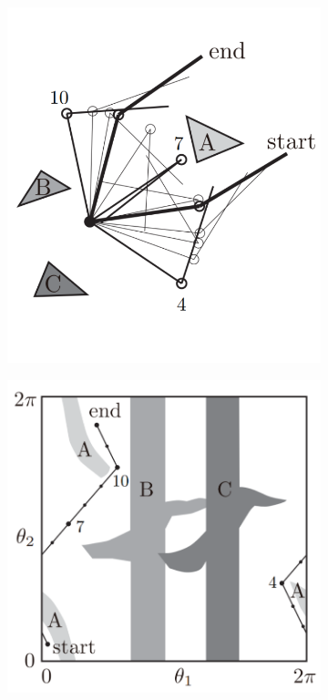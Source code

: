 \documentclass[twoside]{article}
\begin{document}
\begin{figure}[H]
\begin{subfigure}[t]{0.20\textwidth}
\caption{}
\end{subfigure}
\hfil
\begin{subfigure}[t]{0.39\textwidth}
\centering
\includegraphics[width=\columnwidth]{ConfigSpaceDiff2.png}
\caption{}
\end{subfigure}
\hfil
\begin{subfigure}[t]{0.39\textwidth}
\centering
\includegraphics[width=\columnwidth]{ConfigSpaceDiff3.png}
\caption{}
\end{subfigure}


\end{figure}
\end{document}
